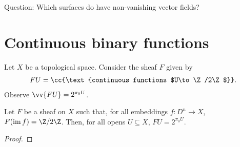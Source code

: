 \documentclass{article}
\begin{document}
Question: Which surfaces do have non-vanishing vector fields?

\section{Continuous binary functions}

Let $X$ be a topological space. Consider the sheaf $F$ given by
\begin{align*}
  FU = \cc{\text{continuous functions $U\to\Z/2\Z$}}.
\end{align*}
Observe $\vv{FU}=2^{\pi_0 U}$.

\begin{proposition}
  Let $F$ be a sheaf on $X$ such that, for all embeddings $f:D^n\to X$,
  $F(\im f)=\Z/2\Z$. Then, for all opens $U\subseteq X$, $FU = 2^{\pi_0 U}$.
  \begin{proof}
    \missingproof
  \end{proof}
\end{proposition}


\printbibliography{}
\end{document}
